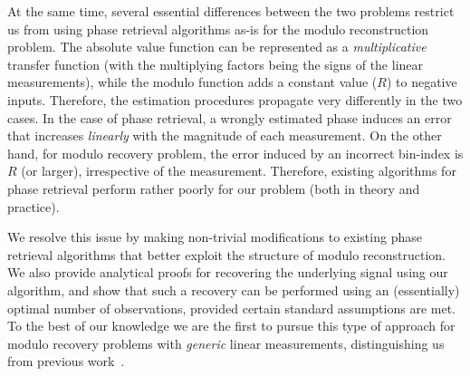 At the same time, several essential differences between the two problems restrict us from using phase retrieval algorithms as-is for the modulo reconstruction problem. The absolute value function can be represented as a \emph{multiplicative} transfer function (with the multiplying factors being the signs of the linear measurements), while the modulo function adds a constant value ($R$) to negative inputs. %
Therefore, the estimation procedures propagate very differently in the two cases. In the case of phase retrieval, a wrongly estimated phase induces an error that increases \emph{linearly} with the magnitude of each measurement. %
On the other hand, for modulo recovery problem, the error induced by an incorrect bin-index is $R$ (or larger), irrespective of the measurement. Therefore, existing algorithms for phase retrieval perform rather poorly for our problem (both in theory and practice). %

We resolve this issue by making non-trivial modifications to existing phase retrieval algorithms that better exploit the structure of modulo reconstruction. We also provide analytical proofs for recovering the underlying signal using our algorithm, and show that such a recovery can be performed using an (essentially) optimal number of observations, provided certain standard assumptions are met. To the best of our knowledge we are the first to pursue this type of approach for modulo recovery problems with \emph{generic} linear measurements, distinguishing us from previous work~\cite{ICCP15_Zhao,Bhandari}. 

